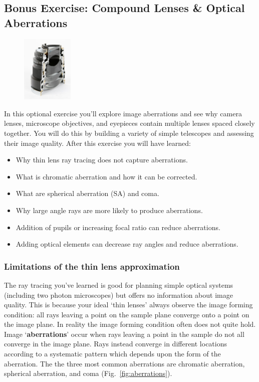 \documentclass[a4paper]{report}
\begin{document}
\subsection{Bonus Exercise: Compound Lenses \& Optical Aberrations}
\begin{figure}
  \begin{center}
    \includegraphics[width=0.22\textwidth]{SLR_lens_cut_in_half.eps}

  \end{center}
  \vspace{-100pt} 
\end{figure}
In this optional exercise you'll explore image aberrations and see why camera lenses, microscope objectives, and eyepieces contain multiple lenses spaced closely together. 
You will do this by building a variety of simple telescopes and assessing their image quality.
After this exercise you will have learned:
\begin{itemize}
    \setlength\itemsep{0.15em}
    \item Why thin lens ray tracing does not capture aberrations.
    \item What is chromatic aberration and how it can be corrected.
    \item What are spherical aberration (SA) and coma.
    \item Why large angle rays are more likely to produce aberrations.
    \item Addition of pupils or increasing focal ratio can reduce aberrations.
    \item Adding optical elements can decrease ray angles and reduce aberrations.
\end{itemize}


\subsubsection{Limitations of the thin lens approximation}
The ray tracing you've learned is good for planning simple optical systems (including two photon microscopes) but offers no information about image quality. 
This is because your ideal `thin lenses' always observe the image forming condition: all rays leaving a point on the sample plane converge onto a point on the image plane. 
In reality the image forming condition often does not quite hold. 
Image `\textbf{aberrations}' occur when rays leaving a point in the sample do not all converge in the image plane.
Rays instead converge in different locations according to a systematic pattern which depends upon the form of the aberration. 
The the three most common aberrations are chromatic aberration, spherical aberration, and coma (Fig.~\ref{fig:aberrations}). 
\end{document}
